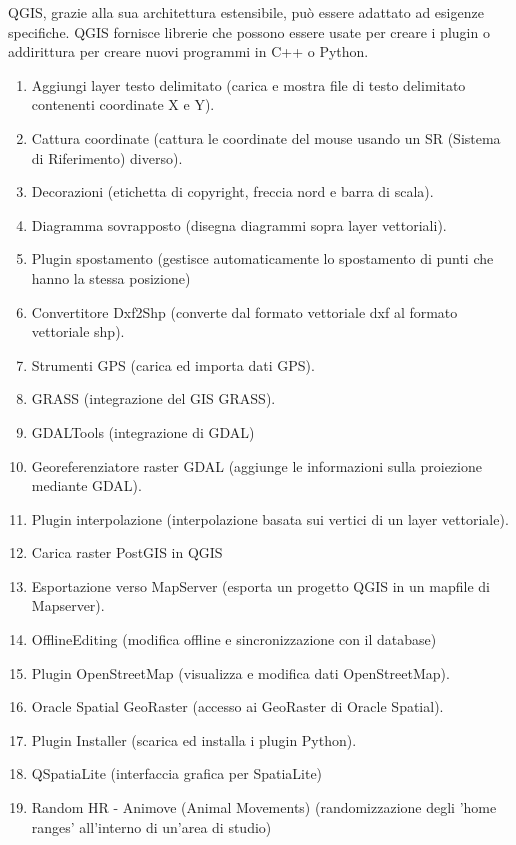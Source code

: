 
QGIS, grazie alla sua architettura estensibile, può essere adattato ad 
esigenze specifiche. QGIS fornisce librerie che possono essere usate per
creare i plugin o addirittura per creare nuovi programmi in C++ o Python.


\begin{enumerate}
\item Aggiungi layer testo delimitato (carica e mostra file di testo delimitato
contenenti coordinate X e Y).
\item Cattura coordinate (cattura le coordinate del mouse usando un SR (Sistema di Riferimento) diverso).
\item Decorazioni (etichetta di copyright, freccia nord e barra di scala).
\item Diagramma sovrapposto (disegna diagrammi sopra layer vettoriali).
\item Plugin spostamento (gestisce automaticamente lo spostamento di punti che hanno la stessa posizione)
\item Convertitore Dxf2Shp (converte dal formato vettoriale dxf al formato vettoriale shp).
\item Strumenti GPS (carica ed importa dati GPS).
\item GRASS (integrazione del GIS GRASS).
\item GDALTools (integrazione di GDAL)
\item Georeferenziatore raster GDAL (aggiunge le informazioni sulla proiezione mediante GDAL).
\item Plugin interpolazione (interpolazione basata sui vertici di un layer vettoriale).
\item Carica raster PostGIS in QGIS
\item Esportazione verso MapServer (esporta un progetto QGIS in un mapfile di Mapserver).
\item OfflineEditing (modifica offline e sincronizzazione con il database)
\item Plugin OpenStreetMap (visualizza e modifica dati OpenStreetMap).
\item Oracle Spatial GeoRaster (accesso ai GeoRaster di Oracle Spatial).
\item Plugin Installer (scarica ed installa i plugin Python).
\item QSpatiaLite (interfaccia grafica per SpatiaLite)
\item Random HR - Animove (Animal Movements) (randomizzazione degli 'home ranges' all'interno di un'area di studio)

\end{enumerate}
